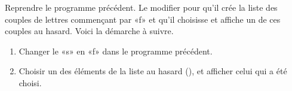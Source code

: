 
\begin{exercice}\label{exoPremiere-0072}

    Reprendre le programme précédent. Le modifier pour qu'il crée la liste des couples de lettres commençant par «f» et qu'il choisisse et affiche un de ces couples au hasard. Voici la démarche à suivre.
    \begin{enumerate}
        \item
            Changer le «s» en «f» dans le programme précédent.
        \item
            Choisir un des éléments de la liste au hasard (), et afficher celui qui a été choisi.
    \end{enumerate}

\end{exercice}
